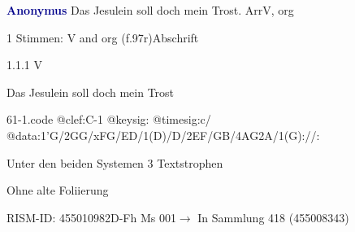 \documentclass[twocolumn, 12pt]{book}
\begin{document}
\par \vspace{16pt} \textcolor{darkblue}{\textbf{Anonymus  }}\hfillplus{\textbf{[61]}}\newline Das Jesulein soll doch mein Trost. Arr\newline V, org
\par \begin{itshape}\end{itshape} 
\par \textcolor{darkblue}{}  1 Stimmen: V and org  (f.97r)\newline Abschrift
\par 1.1.1  V\newline \begin{footnotesize} Das Jesulein soll doch mein Trost \end{footnotesize}  
\begin{filecontents*}{61-1.code}
@clef:C-1
@keysig:
@timesig:c/
@data:1'G/2GG/xFG/ED/1(D)/D/2EF/GB/4AG2A/1(G)://:
\end{filecontents*}
\newline %
\par Unter den beiden Systemen 3 Textstrophen
\par Ohne alte Foliierung
\par RISM-ID: 455010982\newline D-Fh  Ms 001\newline $\rightarrow$ In Sammlung 418 (455008343)
      
\end{document}
